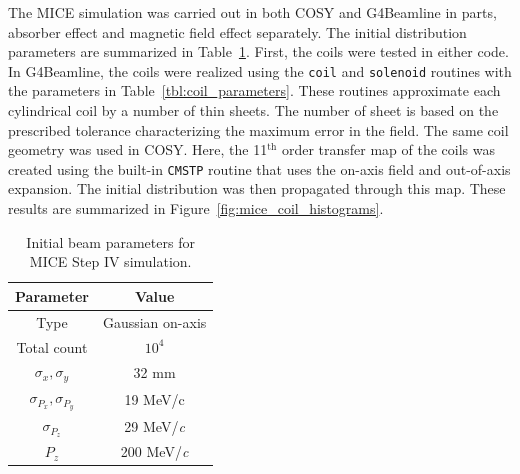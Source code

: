 \documentclass{jacow}
\begin{document}
The MICE simulation was carried out in both COSY and G4Beamline in parts, absorber effect and magnetic field effect separately. The initial distribution parameters are summarized in Table~\ref{tbl:initial_distribution}. First, the coils were tested in either code. In G4Beamline, the coils were realized using the \texttt{coil} and \texttt{solenoid} routines with the parameters in Table~\ref{tbl:coil_parameters}. These routines approximate each cylindrical coil by a number of thin sheets. The number of sheet is based on the prescribed tolerance characterizing the maximum error in the field. The same coil geometry was used in COSY. Here, the 11$^\text{th}$ order transfer map of the coils was created using the built-in \texttt{CMSTP} routine that uses the on-axis field and out-of-axis expansion. The initial distribution was then propagated through this map. These results are summarized in Figure~\ref{fig:mice_coil_histograms}.

\begin{table}[!h]
\begin{center}
\caption{Initial beam parameters for MICE Step IV simulation.}
\begin{tabular}{cc}
	\toprule
	\textbf{Parameter} & \textbf{Value}\\ 
	\midrule
	Type & Gaussian on-axis\\
	Total count & $10^4$\\
	$\sigma_x, \sigma_y$ & 32 mm\\
	$\sigma_{P_x}, \sigma_{P_y}$ & 19 MeV/c\\
	$\sigma_{P_z}$ & 29 MeV/\textit{c} \\
	$P_z$ & 200 MeV/\textit{c} \\
	\bottomrule
\end{tabular}
\label{tbl:initial_distribution}
\end{center}
\end{table}
\end{document}
